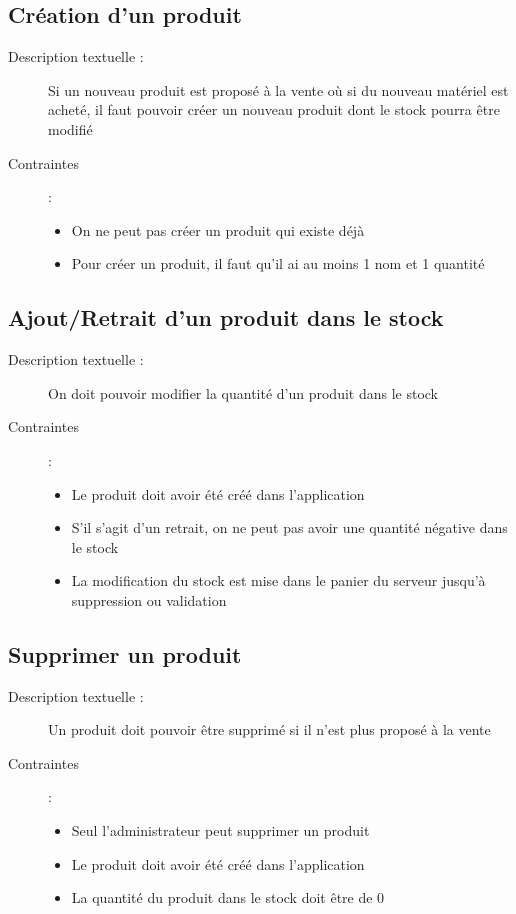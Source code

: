 \documentclass{article}
\begin{document}
  \subsection{Création d'un produit}
    \begin{description}
      \item[Description textuelle :] Si un nouveau produit est proposé à la vente où si du nouveau matériel est acheté, il faut pouvoir créer un nouveau produit dont le stock pourra être modifié
      \item[Contraintes ]: 
        \begin{itemize}
          \item On ne peut pas créer un produit qui existe déjà
          \item Pour créer un produit, il faut qu'il ai au moins 1 nom et 1 quantité
        \end{itemize} 
    \end{description}
  \subsection{Ajout/Retrait d'un produit dans le stock}
    \begin{description}
      \item[Description textuelle :] On doit pouvoir modifier la quantité d'un produit dans le stock
      \item[Contraintes ]:
        \begin{itemize}
          \item Le produit doit avoir été créé dans l'application
          \item S'il s'agit d'un retrait, on ne peut pas avoir une quantité négative dans le stock
          \item La modification du stock est mise dans le panier du serveur jusqu'à suppression ou validation
        \end{itemize}
    \end{description}
  \subsection{Supprimer un produit}
    \begin{description}
      \item[Description textuelle :] Un produit doit pouvoir être supprimé si il n'est plus proposé à la vente
      \item[Contraintes ]:  
        \begin{itemize}
          \item Seul l'administrateur peut supprimer un produit
          \item Le produit doit avoir été créé dans l'application
          \item La quantité du produit dans le stock doit être de 0
        \end{itemize}
    \end{description}
\end{document}
